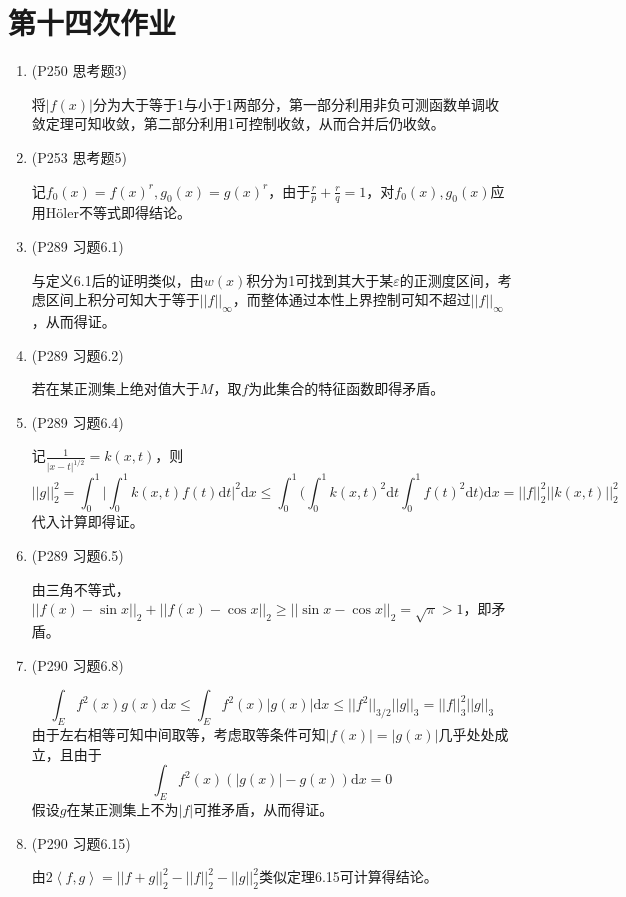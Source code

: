 \documentclass[a4paper,UTF8,fontset=windows]{ctexart}
\begin{document}
\section{第十四次作业}
\begin{enumerate}
    \item (P250 思考题3)
    
    将$|f(x)|$分为大于等于1与小于1两部分，第一部分利用非负可测函数单调收敛定理可知收敛，第二部分利用1可控制收敛，从而合并后仍收敛。
    
    \item (P253 思考题5)
    
    记$f_0(x)=f(x)^r,g_0(x)=g(x)^r$，由于$\frac{r}{p}+\frac{r}{q}=1$，对$f_0(x),g_0(x)$应用H\"oler不等式即得结论。
    
    \item (P289 习题6.1)
    
    与定义6.1后的证明类似，由$w(x)$积分为1可找到其大于某$\varepsilon$的正测度区间，考虑区间上积分可知大于等于$||f||_\infty$，而整体通过本性上界控制可知不超过$||f||_\infty$，从而得证。
    
    \item (P289 习题6.2)
    
    若在某正测集上绝对值大于$M$，取$f$为此集合的特征函数即得矛盾。
    
    \item (P289 习题6.4)
    
    记$\frac{1}{|x-t|^{1/2}}=k(x,t)$，则
    \[||g||_2^2=\int_0^1\bigg|\int_0^1k(x,t)f(t)\mathrm{d}t\bigg|^2\mathrm{d}x\le\int_0^1\bigg(\int_0^1k(x,t)^2\mathrm{d}t\int_0^1f(t)^2\mathrm{d}t\bigg)\mathrm{d}x=||f||_2^2||k(x,t)||_2^2\]
    代入计算即得证。
    
    \item (P289 习题6.5)
    
    由三角不等式，$||f(x)-\sin{x}||_2+||f(x)-\cos{x}||_2\ge||\sin{x}-\cos{x}||_2=\sqrt\pi>1$，即矛盾。
    
    \item (P290 习题6.8)
    
    \[\int_Ef^2(x)g(x)\mathrm{d}x\le\int_Ef^2(x)|g(x)|\mathrm{d}x\le||f^2||_{3/2}||g||_3=||f||_3^2||g||_3\]
    由于左右相等可知中间取等，考虑取等条件可知$|f(x)|=|g(x)|$几乎处处成立，且由于
    $$\int_Ef^2(x)(|g(x)|-g(x))\mathrm{d}x=0$$
    假设$g$在某正测集上不为$|f|$可推矛盾，从而得证。
    
    
    \item (P290 习题6.15)
    
    由$2\left<f,g\right>=||f+g||_2^2-||f||_2^2-||g||_2^2$类似定理6.15可计算得结论。
\end{enumerate}
\end{document}
